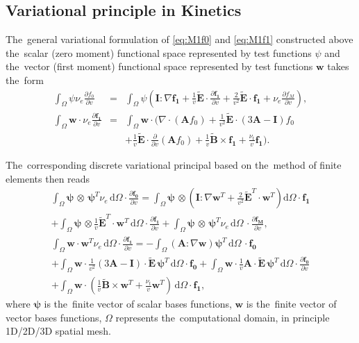 \documentclass[preprint,12pt]{elsarticle}
\newcommand{\pdv}[2]{\frac{\partial{#1}}{\partial{#2}}}
\newcommand{\vect}[1]{\boldsymbol{#1}}
\newcommand{\matr}[1]{\mathbf{#1}}
\newcommand{\dI}{\text{d}}
\newcommand{\nue}{\nu_{e}}
\newcommand{\nutot}{\nu_{t}}
\newcommand{\vmag}{v}
\newcommand{\B}{\vect{B}}
\newcommand{\tE}{\vect{\tilde{E}}}
\newcommand{\tB}{\vect{\tilde{B}}}
\newcommand{\fM}{f_M}
\newcommand{\fzero}{f_0}
\newcommand{\vfzero}{\vect{f_0}}
\newcommand{\fone}{\vect{f_1}}
\newcommand{\MI}{\matr{I}}
\newcommand{\MA}{\matr{A}}
\newcommand{\intO}{\int_{\Omega}}
\newcommand{\Wzero}{\psi}
\newcommand{\Wone}{\matr{w}}
\newcounter{bla}
\begin{document}
\subsection{Variational principle in Kinetics}
The~general variational formulation of \eqref{eq:M1f0} and \eqref{eq:M1f1} 
constructed above the~scalar (zero moment) functional space
represented by test functions $\Wzero$ and the~vector
(first moment) functional space represented by test functions $\vect{w}$ 
takes the~form
\begin{eqnarray}
  \intO\Wzero\nue\pdv{\fzero}{\vmag} &=& 
  \intO\Wzero
  \left(\MI:\nabla\fone + 
  \frac{1}{\vmag}\tE\cdot\pdv{\fone}{\vmag}
  + \frac{2}{\vmag^2}\tE\cdot\fone + \nue \pdv{\fM}{\vmag}\right) , 
  \label{eq:M1hosf0_variational}\\
  \intO\vect{w}\cdot\nue\pdv{\fone}{\vmag} &=&
  \intO\vect{w}\cdot\Bigg(\nabla\cdot\left(\MA\fzero\right)  
  + \frac{1}{\vmag^2}\tE\cdot\left( 3\MA - \MI \right)\fzero
  \nonumber\\
  && 
  + \frac{1}{\vmag}\tE\cdot\pdv{}{\vmag}
  \left( \MA\fzero\right) + \frac{1}{\vmag}\tB\times\fone + 
  \frac{\nutot}{\vmag}\fone\Bigg) .
  \label{eq:M1hosf1_variational}
\end{eqnarray}

The~corresponding discrete variational principal based on the~method of 
finite elements then reads
\begin{multline}
  \intO\vect{\Wzero}\, \otimes\, \vect{\Wzero}^T 
  \nue\, \dI \Omega \cdot \pdv{\vfzero}{\vmag} = 
  \intO\vect{\Wzero}\, \otimes \left(\MI:\nabla\Wone^T + 
  \frac{2}{\vmag^2}\tE^T \cdot\Wone^T \right)\dI \Omega
  \cdot \fone \\
  + \intO\vect{\Wzero}\, \otimes
  \frac{1}{\vmag}\tE^T \cdot \Wone^T\, \dI \Omega 
  \cdot \pdv{\fone}{\vmag} + 
  \intO\vect{\Wzero}\, \otimes\, \vect{\Wzero}^T \nue\, \dI\Omega\,
  \cdot \pdv{\vect{\fM}}{\vmag} , 
  \label{eq:FEM1hosf0}
\end{multline}
\begin{multline}
  \intO\Wone \cdot \Wone^T \nue\, \dI\Omega \cdot 
  \pdv{\fone}{\vmag} =
  - \intO
  \left(\MA : \nabla\Wone\right)
  \vect{\Wzero}^T\, \dI \Omega\, 
  \cdot \vfzero \\
  + \intO\Wone \cdot 
  \frac{1}{\vmag^2} \left( 3\MA - \MI \right) \cdot \tE\,  
  \vect{\Wzero}^T\, \dI\Omega \cdot \vfzero 
  + \intO\Wone \cdot
  \frac{1}{\vmag} \MA \cdot \tE\, \vect{\Wzero}^T\, \dI \Omega 
  \cdot \pdv{\vfzero}{\vmag}\\
  + \intO\Wone \cdot
  \left(\frac{1}{\vmag}\tilde{\B}\times\Wone^T + 
  \frac{\nutot}{\vmag} \Wone^T\right)\, \dI\Omega 
  \cdot \fone ,
  \label{eq:FEM1hosf1}
\end{multline}
where $\vect{\Wzero}$ is the~finite vector of scalar bases functions, 
$\Wone$ is the~finite vector of vector bases functions,
$\Omega$ represents the~computational domain, in principle 1D/2D/3D 
spatial mesh. 
\end{document}

